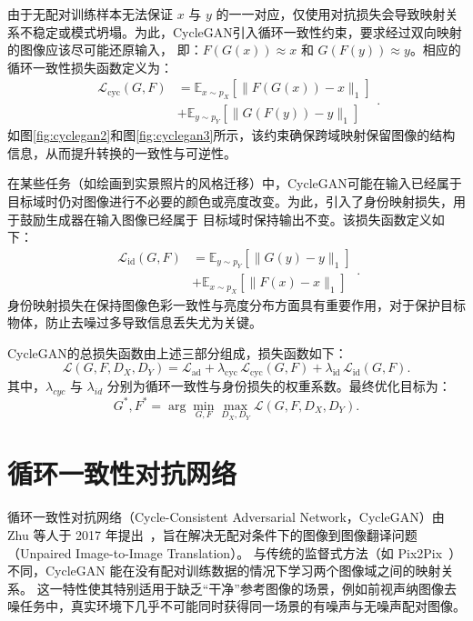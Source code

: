 由于无配对训练样本无法保证 $x$ 与 $y$ 的一一对应，仅使用对抗损失会导致映射关系不稳定或模式坍塌。为此，CycleGAN引入循环一致性约束，要求经过双向映射的图像应该尽可能还原输入，
即：$F(G(x)) \approx x$ 和 $G(F(y)) \approx y$。相应的循环一致性损失函数定义为：
\begin{equation}
    \label{eq2}
    \begin{aligned}
        \mathcal{L}_\mathrm{cyc}(G,F) &= \mathbb{E}_{x \sim p_X}[\|F(G(x))-x\|_1] \\
        &+ \mathbb{E}_{y \sim p_Y}[\|G(F(y))-y\|_1] 
    \end{aligned}.
\end{equation}
如图\ref{fig:cyclegan2}和图\ref{fig:cyclegan3}所示，该约束确保跨域映射保留图像的结构信息，从而提升转换的一致性与可逆性。

在某些任务（如绘画到实景照片的风格迁移）中，CycleGAN可能在输入已经属于目标域时仍对图像进行不必要的颜色或亮度改变。为此，引入了身份映射损失，用于鼓励生成器在输入图像已经属于
目标域时保持输出不变。该损失函数定义如下：
\begin{equation}
    \label{eq3}
    \begin{aligned}
        \mathcal{L}_\mathrm{id}(G,F) &= \mathbb{E}_{y \sim p_Y}[\|G(y)-y\|_1] \\
        &+ \mathbb{E}_{x \sim p_X}[\|F(x)-x\|_1] 
    \end{aligned}.
\end{equation}
身份映射损失在保持图像色彩一致性与亮度分布方面具有重要作用，对于保护目标物体，防止去噪过多导致信息丢失尤为关键。

CycleGAN的总损失函数由上述三部分组成，损失函数如下：
\begin{equation}
    \label{eq4}
    \mathcal{L}(G, F, D_X, D_Y)=\mathcal{L}_{\mathrm{ad}}+\lambda_\mathrm{cyc}\,\mathcal{L}_\mathrm{cyc}(G,F)+\lambda_\mathrm{id}\,\mathcal{L}_\mathrm{id}(G,F).
\end{equation}
其中，$\lambda_{cyc}$ 与 $\lambda_{id}$ 分别为循环一致性与身份损失的权重系数。最终优化目标为：
\begin{equation}
	\label{eq5}
	G^*, F^* = \arg \min_{G,F} \max_{D_X, D_Y} \mathcal{L}(G, F, D_X, D_Y).
\end{equation}


\section{循环一致性对抗网络}

循环一致性对抗网络（Cycle-Consistent Adversarial Network，CycleGAN）由 Zhu 等人于 2017 年提出~\cite{zhu2017unpaired}，旨在解决无配对条件下的图像到图像翻译问题（Unpaired Image-to-Image Translation）。
与传统的监督式方法（如 Pix2Pix~\cite{isola2017image}）不同，CycleGAN 能在没有配对训练数据的情况下学习两个图像域之间的映射关系。
这一特性使其特别适用于缺乏“干净”参考图像的场景，例如前视声纳图像去噪任务中，真实环境下几乎不可能同时获得同一场景的有噪声与无噪声配对图像。

